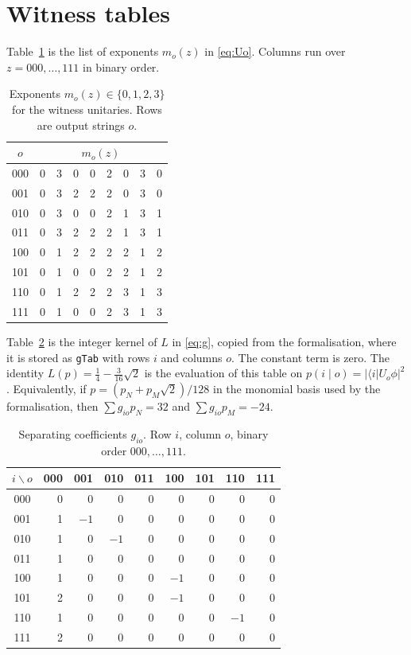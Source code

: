 \documentclass[11pt]{article}
\theoremstyle{definition}
\theoremstyle{remark}
\newcommand{\bra}[1]{\langle #1\rvert}
\begin{document}
\section{Witness tables}
\label{app:witness}

Table~\ref{tab:m} is the list of exponents \(m_o(z)\) in \eqref{eq:Uo}. Columns run over \(z=000,\ldots,111\) in binary order.

\begin{table}[ht]
\centering
\caption{Exponents \(m_o(z)\in\{0,1,2,3\}\) for the witness unitaries. Rows are output strings \(o\).}
\label{tab:m}
\begin{tabular}{c@{\quad}cccccccc}
\toprule
\(o\) & \multicolumn{8}{c}{\(m_o(z)\)}\\
\midrule
000 & 0 & 3 & 0 & 0 & 2 & 0 & 3 & 0\\
001 & 0 & 3 & 2 & 2 & 2 & 0 & 3 & 0\\
010 & 0 & 3 & 0 & 0 & 2 & 1 & 3 & 1\\
011 & 0 & 3 & 2 & 2 & 2 & 1 & 3 & 1\\
100 & 0 & 1 & 2 & 2 & 2 & 2 & 1 & 2\\
101 & 0 & 1 & 0 & 0 & 2 & 2 & 1 & 2\\
110 & 0 & 1 & 2 & 2 & 2 & 3 & 1 & 3\\
111 & 0 & 1 & 0 & 0 & 2 & 3 & 1 & 3\\
\bottomrule
\end{tabular}
\end{table}

Table~\ref{tab:g} is the integer kernel of \(L\) in \eqref{eq:g}, copied from the formalisation, where it is stored as \texttt{gTab} with rows \(i\) and columns \(o\). The constant term is zero. The identity \(L(p)=\tfrac14-\tfrac{3}{16}\sqrt{2}\) is the evaluation of this table on \(p(i\mid o)=\lvert\bra{i}U_o\phi\rvert^2\). Equivalently, if \(p=(p_N+p_M\sqrt{2})/128\) in the monomial basis used by the formalisation, then \(\sum g_{io}p_N=32\) and \(\sum g_{io}p_M=-24\).

\begin{table}[ht]
\centering
\caption{Separating coefficients \(g_{io}\). Row \(i\), column \(o\), binary order \(000,\ldots,111\).}
\label{tab:g}
\begin{tabular}{c@{\quad}rrrrrrrr}
\toprule
\(i\backslash o\) & 000 & 001 & 010 & 011 & 100 & 101 & 110 & 111\\
\midrule
000 & 0 & 0 & 0 & 0 & 0 & 0 & 0 & 0\\
001 & 1 & $-1$ & 0 & 0 & 0 & 0 & 0 & 0\\
010 & 1 & 0 & $-1$ & 0 & 0 & 0 & 0 & 0\\
011 & 1 & 0 & 0 & 0 & 0 & 0 & 0 & 0\\
100 & 1 & 0 & 0 & 0 & $-1$ & 0 & 0 & 0\\
101 & 2 & 0 & 0 & 0 & $-1$ & 0 & 0 & 0\\
110 & 1 & 0 & 0 & 0 & 0 & 0 & $-1$ & 0\\
111 & 2 & 0 & 0 & 0 & 0 & 0 & 0 & 0\\
\bottomrule
\end{tabular}
\end{table}
\end{document}
